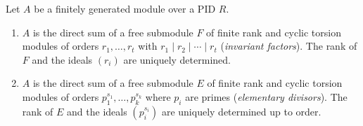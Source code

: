 Let $A$ be a finitely generated module over a PID $R$.
\begin{enumerate}
\item[(i)] $A$ is the direct sum of a free submodule $F$ of finite rank and cyclic torsion modules of orders $r_1,\ldots,r_t$ with $r_1 \mid r_2 \mid \cdots \mid r_t$ (\emph{invariant factors}). The rank of $F$ and the ideals $(r_i)$ are uniquely determined.
\item[(ii)] $A$ is the direct sum of a free submodule $E$ of finite rank and cyclic torsion modules of orders $p_1^{s_1},\ldots,p_k^{s_k}$ where $p_i$ are primes (\emph{elementary divisors}). The rank of $E$ and the ideals $(p_i^{s_i})$ are uniquely determined up to order.
\end{enumerate}
